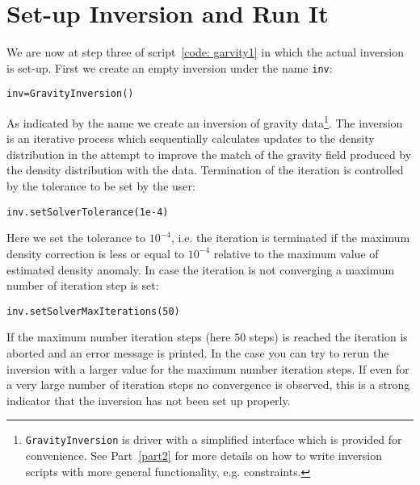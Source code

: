 \section{Set-up Inversion and Run It}
We are now at step three of script~\ref{code: garvity1} in which the actual inversion is set-up. First 
we create an empty inversion under the name \verb|inv|:
\begin{verbatim}
inv=GravityInversion()
\end{verbatim}
As indicated by the name we create an inversion of gravity 
data\footnote{\verb|GravityInversion| is driver with a simplified interface 
which is provided for convenience. See Part~\ref{part2} for more details 
on how to write inversion scripts with more general functionality, e.g. constraints.}. The inversion
is an iterative process which sequentially calculates updates to the density distribution 
in the attempt to improve the match of the gravity field produced by the density distribution with the data. 
Termination of the iteration is controlled by the tolerance to be set by the user:
\begin{verbatim}
inv.setSolverTolerance(1e-4)
\end{verbatim}
Here we set the tolerance to $10^{-4}$, i.e. the iteration is terminated if the maximum density correction
is less or equal to $10^{-4}$ relative to the maximum value of estimated density anomaly. In case the 
iteration is not converging a maximum number of iteration step is set:  
\begin{verbatim}
inv.setSolverMaxIterations(50)
\end{verbatim}
If the maximum number iteration steps (here $50$ steps) is reached the iteration is aborted and an error message is
printed. In the case you can try to rerun the inversion with a larger value for the maximum number iteration steps. If even for 
a very large number of iteration steps no convergence is observed, this is a strong indicator that the inversion has not been
set up properly. 

